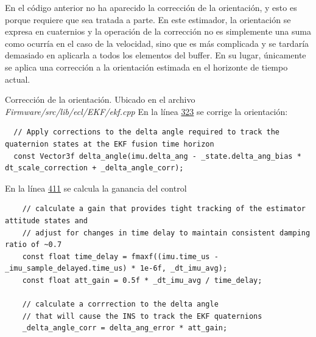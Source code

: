 En el código anterior no ha aparecido la corrección de la orientación, y esto es porque requiere que sea tratada a parte. En este estimador, la orientación se expresa en cuaternios y la operación de la corrección no es simplemente una suma como ocurría en el caso de la velocidad, sino que es más complicada y se tardaría demasiado en aplicarla a todos los elementos del buffer. En su lugar, únicamente se aplica una corrección a la orientación estimada en el horizonte de tiempo actual.

\begin{codigo}{Corrección de la orientación. Ubicado en el archivo \textit{Firmware/src/lib/ecl/EKF/ekf.cpp}}
En la línea \href{https://github.com/PX4/PX4-ECL/blob/ec934908900b23ee273d1a9f82364b7b38423200/EKF/ekf.cpp\#L323}{323} se corrige la orientación:
\begin{verbatim}
  // Apply corrections to the delta angle required to track the quaternion states at the EKF fusion time horizon
  const Vector3f delta_angle(imu.delta_ang - _state.delta_ang_bias * dt_scale_correction + _delta_angle_corr);
\end{verbatim}
En la línea \href{https://github.com/PX4/PX4-ECL/blob/ec934908900b23ee273d1a9f82364b7b38423200/EKF/ekf.cpp\#L411}{411} se calcula la ganancia del control
\begin{verbatim}
    // calculate a gain that provides tight tracking of the estimator attitude states and
    // adjust for changes in time delay to maintain consistent damping ratio of ~0.7
    const float time_delay = fmaxf((imu.time_us - _imu_sample_delayed.time_us) * 1e-6f, _dt_imu_avg);
    const float att_gain = 0.5f * _dt_imu_avg / time_delay;
    
    // calculate a corrrection to the delta angle
    // that will cause the INS to track the EKF quaternions
    _delta_angle_corr = delta_ang_error * att_gain;
\end{verbatim}
\end{codigo} 


